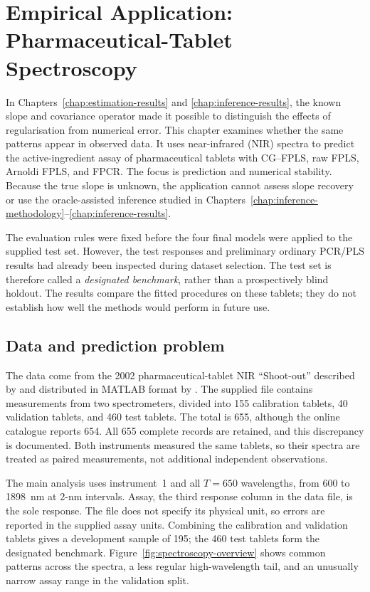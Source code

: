 \chapter{Empirical Application: Pharmaceutical-Tablet Spectroscopy}
\label{chap:spectroscopy-application}

In Chapters~\ref{chap:estimation-results} and \ref{chap:inference-results},
the known slope and covariance operator made it possible to distinguish the
effects of regularisation from numerical error.  This chapter examines
whether the same patterns appear in observed data.  It uses near-infrared
(NIR) spectra to predict the active-ingredient assay of pharmaceutical
tablets with CG--FPLS, raw FPLS, Arnoldi FPLS, and FPCR.  The focus is
prediction and numerical stability.  Because the true slope is unknown,
the application cannot assess slope recovery or use the oracle-assisted
inference studied in Chapters~\ref{chap:inference-methodology}--\ref{chap:inference-results}.

The evaluation rules were fixed before the four final models were applied
to the supplied test set.  However, the test responses and preliminary
ordinary PCR/PLS results had already been inspected during dataset
selection.  The test set is therefore called a \emph{designated benchmark},
rather than a prospectively blind holdout.  The results compare the fitted
procedures on these tablets; they do not establish how well the methods
would perform in future use.

\section{Data and prediction problem}
\label{sec:spectroscopy-data}

The data come from the 2002 pharmaceutical-tablet NIR ``Shoot-out'' described
by \textcite{hopkins_2003} and distributed in MATLAB format by
\textcite{eigenvector_tablets}.  The supplied file contains measurements
from two spectrometers, divided into 155 calibration tablets, 40 validation
tablets, and 460 test tablets.  The total is 655, although the online
catalogue reports 654.  All 655 complete records are retained, and this
discrepancy is documented.  Both instruments measured the same tablets, so
their spectra are treated as paired measurements, not additional independent
observations.

The main analysis uses instrument~1 and all $T=650$ wavelengths, from 600
to 1898~nm at 2-nm intervals.  Assay, the third response column in the data
file, is the sole response.  The file does not specify its physical unit,
so errors are reported in the supplied assay units.  Combining the
calibration and validation tablets gives a development sample of 195;
the 460 test tablets form the designated benchmark.
Figure~\ref{fig:spectroscopy-overview} shows common patterns across the
spectra, a less regular high-wavelength tail, and an unusually narrow assay
range in the validation split.

